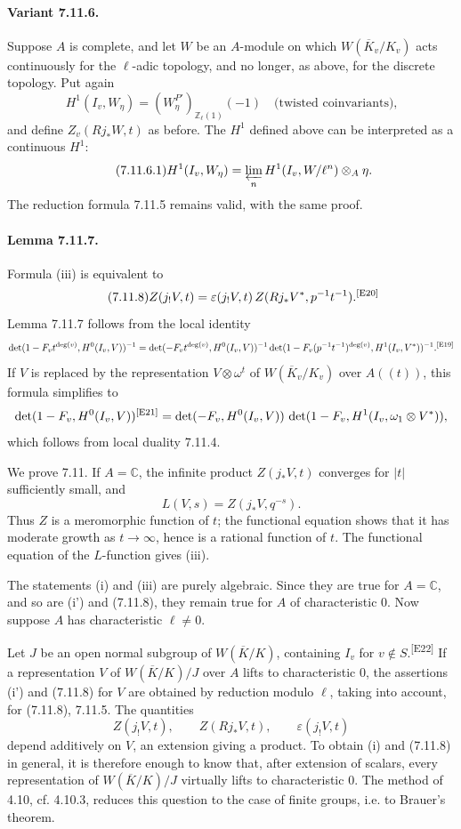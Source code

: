 \documentclass[10pt,letterpaper]{article}
\newcommand{\C}{\mathbb C}
\newcommand{\auditmark}[1]{\textsuperscript{\normalfont\scriptsize[E#1]}}
\begin{document}
\paragraph{Variant 7.11.6.} Suppose \(A\) is complete, and let \(W\) be an \(A\)-module on which \(W(\overline K_v/K_v)\) acts continuously for the \(\ell\)-adic topology, and no longer, as above, for the discrete topology. Put again
\[
H^1(I_v,W_\eta)=(W_\eta^{P'})_{\mathbb Z_\ell(1)}(-1)
\quad\text{(twisted coinvariants),}
\]
and define \(Z_v(Rj_*W,t)\) as before. The \(H^1\) defined above can be interpreted as a continuous \(H^1\):
\[
\tag{7.11.6.1}
H^1(I_v,W_\eta)=
\varprojlim_n H^1(I_v,W/\ell^n)\otimes_A\eta.
\]
The reduction formula 7.11.5 remains valid, with the same proof.

\paragraph{Lemma 7.11.7.} Formula (iii) is equivalent to
\[
\tag{7.11.8}
Z(j_!V,t)=\varepsilon(j_!V,t)\,Z(Rj_*V^*,p^{-1}t^{-1}).\auditmark{20}
\]
Lemma 7.11.7 follows from the local identity
\[
\det(1-F_vt^{\deg(v)},H^0(I_v,V))^{-1}
=
\det(-F_vt^{\deg(v)},H^0(I_v,V))^{-1}
\det(1-F_v(p^{-1}t^{-1})^{\deg(v)},H^1(I_v,V^*))^{-1}.\auditmark{19}
\]
If \(V\) is replaced by the representation \(V\otimes\omega^t\) of \(W(\overline K_v/K_v)\) over \(A((t))\), this formula simplifies to
\[
\det(1-F_v,H^0(I_v,V))\auditmark{21}
=
\det(-F_v,H^0(I_v,V))\,
\det(1-F_v,H^1(I_v,\omega_1\otimes V^*)),
\]
which follows from local duality 7.11.4.

We prove 7.11. If \(A=\C\), the infinite product \(Z(j_*V,t)\) converges for \(|t|\) sufficiently small, and
\[
L(V,s)=Z(j_*V,q^{-s}).
\]
Thus \(Z\) is a meromorphic function of \(t\); the functional equation shows that it has moderate growth as \(t\to\infty\), hence is a rational function of \(t\). The functional equation of the \(L\)-function gives (iii).

The statements (i) and (iii) are purely algebraic. Since they are true for \(A=\C\), and so are (i') and (7.11.8), they remain true for \(A\) of characteristic \(0\). Now suppose \(A\) has characteristic \(\ell\ne0\).

Let \(J\) be an open normal subgroup of \(W(\overline K/K)\), containing \(I_v\) for \(v\notin S\).\auditmark{22} If a representation \(V\) of \(W(\overline K/K)/J\) over \(A\) lifts to characteristic \(0\), the assertions (i') and (7.11.8) for \(V\) are obtained by reduction modulo \(\ell\), taking into account, for (7.11.8), 7.11.5. The quantities
\[
Z(j_!V,t),\qquad Z(Rj_*V,t),\qquad \varepsilon(j_!V,t)
\]
depend additively on \(V\), an extension giving a product. To obtain (i) and (7.11.8) in general, it is therefore enough to know that, after extension of scalars, every representation of \(W(\overline K/K)/J\) virtually lifts to characteristic \(0\). The method of 4.10, cf. 4.10.3, reduces this question to the case of finite groups, i.e. to Brauer's theorem.
\end{document}

